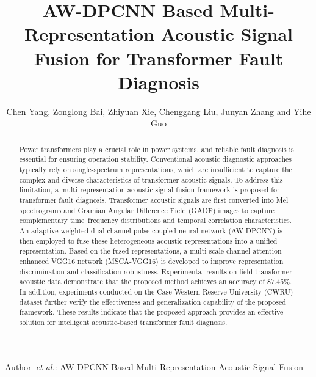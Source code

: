 \documentclass[journal]{IEEEtran}
\begin{document}
\title{AW-DPCNN Based Multi-Representation Acoustic Signal Fusion for Transformer Fault Diagnosis}

\author{Chen Yang, Zonglong Bai, Zhiyuan Xie, Chenggang Liu, Junyan Zhang and Yihe Guo%
}

%
{Author~\MakeLowercase{\textit{et al.}}: AW-DPCNN Based Multi-Representation Acoustic Signal Fusion}

\maketitle

\begin{abstract}
Power transformers play a crucial role in power systems, and reliable fault diagnosis is essential for ensuring operation stability. Conventional acoustic diagnostic approaches typically rely on single-spectrum representations, which are insufficient to capture the complex and diverse characteristics of transformer acoustic signals. To address this limitation, a multi-representation acoustic signal fusion framework is proposed for transformer fault diagnosis. Transformer acoustic signals are first converted into Mel spectrograms and Gramian Angular Difference Field (GADF) images to capture complementary time–frequency distributions and temporal correlation characteristics. An adaptive weighted dual-channel pulse-coupled neural network (AW-DPCNN) is then employed to fuse these heterogeneous acoustic representations into a unified representation. Based on the fused representations, a multi-scale channel attention enhanced VGG16 network (MSCA-VGG16) is developed to improve representation discrimination and classification robustness. Experimental results on field transformer acoustic data demonstrate that the proposed method achieves an accuracy of 87.45\%. In addition, experiments conducted on the Case Western Reserve University (CWRU) dataset further verify the effectiveness and generalization capability of the proposed framework. These results indicate that the proposed approach provides an effective solution for intelligent acoustic-based transformer fault diagnosis.
\end{abstract}
\end{document}
